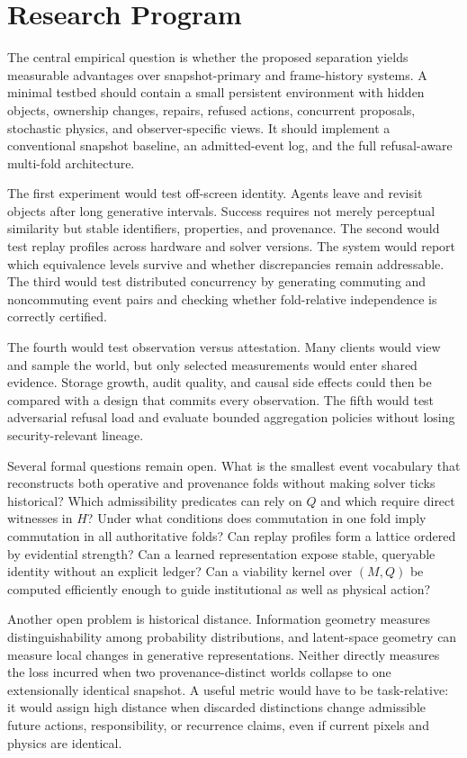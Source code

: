 \documentclass[11pt]{article}
\begin{document}
\section{Research Program}

The central empirical question is whether the proposed separation yields measurable advantages over snapshot-primary and frame-history systems. A minimal testbed should contain a small persistent environment with hidden objects, ownership changes, repairs, refused actions, concurrent proposals, stochastic physics, and observer-specific views. It should implement a conventional snapshot baseline, an admitted-event log, and the full refusal-aware multi-fold architecture.

The first experiment would test off-screen identity. Agents leave and revisit objects after long generative intervals. Success requires not merely perceptual similarity but stable identifiers, properties, and provenance. The second would test replay profiles across hardware and solver versions. The system would report which equivalence levels survive and whether discrepancies remain addressable. The third would test distributed concurrency by generating commuting and noncommuting event pairs and checking whether fold-relative independence is correctly certified.

The fourth would test observation versus attestation. Many clients would view and sample the world, but only selected measurements would enter shared evidence. Storage growth, audit quality, and causal side effects could then be compared with a design that commits every observation. The fifth would test adversarial refusal load and evaluate bounded aggregation policies without losing security-relevant lineage.

Several formal questions remain open. What is the smallest event vocabulary that reconstructs both operative and provenance folds without making solver ticks historical? Which admissibility predicates can rely on $Q$ and which require direct witnesses in $H$? Under what conditions does commutation in one fold imply commutation in all authoritative folds? Can replay profiles form a lattice ordered by evidential strength? Can a learned representation expose stable, queryable identity without an explicit ledger? Can a viability kernel over $(M,Q)$ be computed efficiently enough to guide institutional as well as physical action?

Another open problem is historical distance. Information geometry measures distinguishability among probability distributions, and latent-space geometry can measure local changes in generative representations. Neither directly measures the loss incurred when two provenance-distinct worlds collapse to one extensionally identical snapshot. A useful metric would have to be task-relative: it would assign high distance when discarded distinctions change admissible future actions, responsibility, or recurrence claims, even if current pixels and physics are identical.
\end{document}
